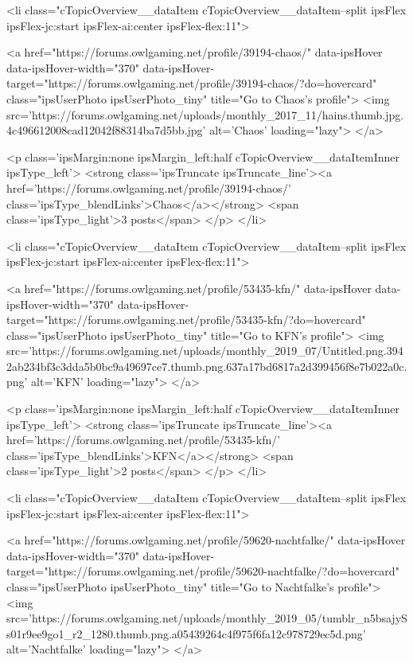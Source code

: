 						<li class="cTopicOverview__dataItem cTopicOverview__dataItem--split ipsFlex ipsFlex-jc:start ipsFlex-ai:center ipsFlex-flex:11">
							


	<a href="https://forums.owlgaming.net/profile/39194-chaos/" data-ipsHover data-ipsHover-width="370" data-ipsHover-target="https://forums.owlgaming.net/profile/39194-chaos/?do=hovercard" class="ipsUserPhoto ipsUserPhoto_tiny" title="Go to Chaos's profile">
		<img src='https://forums.owlgaming.net/uploads/monthly_2017_11/hains.thumb.jpg.4c496612008cad12042f88314ba7d5bb.jpg' alt='Chaos' loading="lazy">
	</a>

							<p class='ipsMargin:none ipsMargin_left:half cTopicOverview__dataItemInner ipsType_left'>
								<strong class='ipsTruncate ipsTruncate_line'><a href='https://forums.owlgaming.net/profile/39194-chaos/' class='ipsType_blendLinks'>Chaos</a></strong>
								<span class='ipsType_light'>3 posts</span>
							</p>
						</li>
					
						<li class="cTopicOverview__dataItem cTopicOverview__dataItem--split ipsFlex ipsFlex-jc:start ipsFlex-ai:center ipsFlex-flex:11">
							


	<a href="https://forums.owlgaming.net/profile/53435-kfn/" data-ipsHover data-ipsHover-width="370" data-ipsHover-target="https://forums.owlgaming.net/profile/53435-kfn/?do=hovercard" class="ipsUserPhoto ipsUserPhoto_tiny" title="Go to KFN's profile">
		<img src='https://forums.owlgaming.net/uploads/monthly_2019_07/Untitled.png.3942ab234bf3c3dda5b0bc9a49697ce7.thumb.png.637a17bd6817a2d399456f8e7b022a0c.png' alt='KFN' loading="lazy">
	</a>

							<p class='ipsMargin:none ipsMargin_left:half cTopicOverview__dataItemInner ipsType_left'>
								<strong class='ipsTruncate ipsTruncate_line'><a href='https://forums.owlgaming.net/profile/53435-kfn/' class='ipsType_blendLinks'>KFN</a></strong>
								<span class='ipsType_light'>2 posts</span>
							</p>
						</li>
					
						<li class="cTopicOverview__dataItem cTopicOverview__dataItem--split ipsFlex ipsFlex-jc:start ipsFlex-ai:center ipsFlex-flex:11">
							


	<a href="https://forums.owlgaming.net/profile/59620-nachtfalke/" data-ipsHover data-ipsHover-width="370" data-ipsHover-target="https://forums.owlgaming.net/profile/59620-nachtfalke/?do=hovercard" class="ipsUserPhoto ipsUserPhoto_tiny" title="Go to Nachtfalke's profile">
		<img src='https://forums.owlgaming.net/uploads/monthly_2019_05/tumblr_n5bsajySs01r9ee9go1_r2_1280.thumb.png.a05439264c4f975f6fa12c978729ec5d.png' alt='Nachtfalke' loading="lazy">
	</a>

